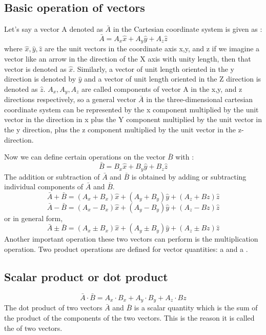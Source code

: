 \subsection{Basic operation of vectors}
Let's say a vector A denoted as $\bar{A}$ in the Cartesian coordinate system is given as :
\begin{equation}
\bar{A} = A_{x}\hat{x} + A_{y}\hat{y} + A_{z}\hat{z} 
\end{equation}
where $\hat{x},\hat{y},\hat{z}$ are the unit vectors in the coordinate axis x,y, and z if we imagine a vector like an arrow in the direction of the X axis with unity length, then that vector is denoted as $\hat{x}$. Similarly, a vector of unit length oriented in the y direction is denoted by $\hat{y}$ and a vector of unit length oriented in the Z direction is denoted as $\hat{z}$. $A_{x}, A_{y}, A_{z}$ are called components of vector A in the x,y, and z directions respectively, so a general vector $\bar{A}$ in the three-dimensional cartesian coordinate system can be represented by the x component multiplied by the unit vector in the direction in x plus the Y component multiplied by the unit vector in the y direction, plus the z component multiplied by the unit vector in the z-direction.

Now we can define certain operations on the vector $\bar{B}$ with : 
\begin{equation}
\bar{B} = B_{x}\hat{x} + B_{y}\hat{y} + B_{z}\hat{z} 
\end{equation} 
The addition or subtraction of $\bar{A}$ and $\bar{B}$ is obtained by adding or subtracting individual components of $\bar{A}$ and $\bar{B}$.
\begin{equation}
\bar{A} + \bar{B} = (A_{x} + B_{x} )\hat{x} + (A_{y} + B_{y})\hat{y} +(A_{z} + B{z})\hat{z} 
\end{equation}
\begin{equation}
\bar{A} - \bar{B} = (A_{x} - B_{x} )\hat{x} + (A_{y} - B_{y})\hat{y} +(A_{z} - B{z})\hat{z}
\end{equation}
or in general form,
\begin{equation}
\bar{A} \pm \bar{B} = (A_{x} \pm B_{x} )\hat{x} + (A_{y} \pm B_{y})\hat{y} +(A_{z} \pm B{z})\hat{z}
\end{equation}
Another important operation these two vectors can perform is the multiplication operation. Two product operations are defined for vector quantities: a  and a .

\subsection{Scalar product or dot product}
\begin{equation}
\bar{A}\cdot\bar{B} = A_{x}\cdot B_{x} + A_{y}\cdot B_{y} + A_{z}\cdot B{z} 
\end{equation}
The dot product of two vectors $\bar{A}$ and $\bar{B}$ is a scalar quantity which is the sum of the product of the components of the two vectors. This is the reason it is called the  of two vectors.
